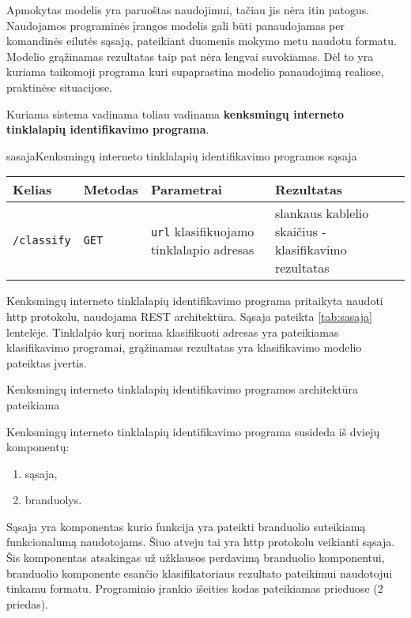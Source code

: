 
Apmokytas modelis yra paruoštas naudojimui, tačiau jis nėra itin patogus. Naudojamos programinės įrangos modelis gali
būti panaudojamas per komandinės eilutės sąsają, pateikiant duomenis mokymo metu naudotu formatu. Modelio grąžinamas
rezultatas taip pat nėra lengvai suvokiamas. Dėl to yra kuriama taikomoji programa kuri supaprastina modelio
panaudojimą realiose, praktinėse situacijose.

Kuriama sistema vadinama toliau vadinama \textbf{kenksmingų interneto tinklalapių identifikavimo programa}.

\begin{ktutable}{sasaja}{Kenksmingų interneto tinklalapių identifikavimo programos sąsaja}
    \begin{tabular}{|l|l|p{5cm}|p{5cm}|}
    \hline
        Kelias & Metodas & Parametrai & Rezultatas \\ \hline
        \texttt{/classify} & \texttt{GET} & \texttt{url} klasifikuojamo tinklalapio adresas & slankaus kablelio skaičius - klasifikavimo rezultatas \\ \hline
    \end{tabular}
\end{ktutable}

Kenksmingų interneto tinklalapių identifikavimo programa pritaikyta naudoti http protokolu, naudojama REST architektūra. Sąsaja pateikta \vref{tab:sasaja}
lentelėje. Tinklalpio kurį norima klasifikuoti adresas yra pateikiamas klasifikavimo programai, grąžinamas
rezultatas yra klasifikavimo modelio pateiktas įvertis.

Kenksmingų interneto tinklalapių identifikavimo programos architektūra pateikiama 


Kenksmingų interneto tinklalapių identifikavimo programa susideda iš dviejų komponentų:
\begin{enumerate}
\item sąsaja,
\item branduolys.
\end{enumerate}
Sąsaja yra komponentas kurio funkcija yra pateikti branduolio suteikiamą funkcionalumą naudotojams. Šiuo atveju
tai yra http protokolu veikianti sąsaja. Šis komponentas atsakingas už užklausos perdavimą branduolio komponentui,
branduolio komponente esančio klasifikatoriaus rezultato pateikimui naudotojui tinkamu formatu. Programinio
įrankio išeities kodas pateikiamas prieduose (2 priedas).

